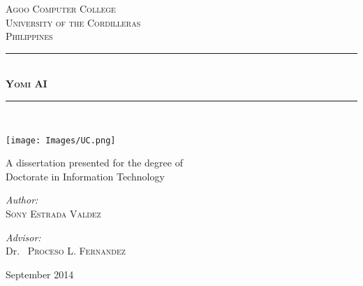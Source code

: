 \newcommand{\HRule}{\rule{\linewidth}{0.5mm}}

\begin{titlepage}
    \begin{center}
        \vspace*{1cm}
        
        \normalsize
        \textsc{Agoo Computer College}\\
        \textsc{University of the Cordilleras}\\
        \textsc{Philippines}\\

		  \vspace{2.5cm}

        \HRule \\[0.4cm]
        \Huge\textbf\textsc{Yomi AI}
        \HRule \\

		  \vspace{0.5cm}
		                          
        \texttt{[image: Images/UC.png]}

        \vfill
                
        \normalsize
        A dissertation presented for the degree of \\
        Doctorate in Information Technology

		  \Huge
        \begin{minipage}{0.45\textwidth}
        \begin{flushleft} \large
        \emph{Author:}\\
        \textsc{Sony Estrada Valdez}
        \end{flushleft}
        \end{minipage}
        \begin{minipage}{0.47\textwidth}
        \begin{flushright} \large
        \emph{Advisor:} \\
        Dr.~ \textsc{Proceso L. Fernandez}
        \end{flushright}
        \end{minipage}
		  		
		  \vspace{1.3cm}
                
        \Large
        September 2014
        
    \end{center}
\end{titlepage}
\fi



